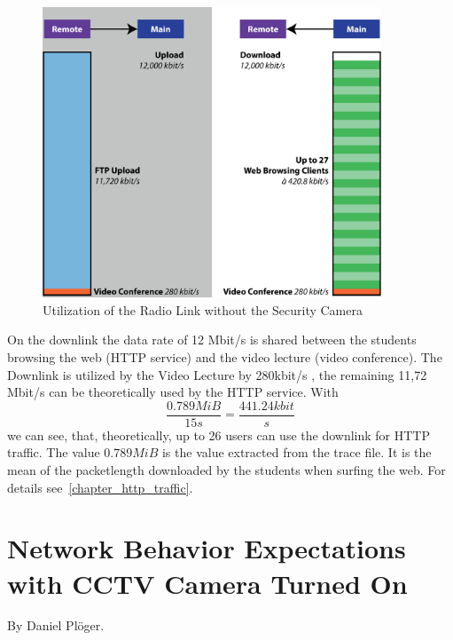 \documentclass[a4paper,10pt]{book}\usepackage{graphicx}
\begin{document}
\begin{figure}[!ht]
  \begin{center}
    \includegraphics[width=0.9\textwidth]{graphics-02.eps}
    \caption{Utilization of the Radio Link without the Security Camera}
    \label{fig:rLink}
    \end{center}
\end{figure}

On the downlink the data rate of 12 Mbit/s is shared between the students browsing the web (HTTP service) and the video lecture (video conference).
The Downlink is utilized by the Video Lecture by 280kbit/s , the remaining 11,72 Mbit/s can be theoretically used by the HTTP service. With 
\begin{equation}
 \frac{0.789 MiB}{15s}=\frac{441.24 kbit}{s}
\end{equation}
we can see, that, theoretically, up to 26 users can use the downlink for HTTP traffic. The value $0.789MiB$ is the value extracted from the trace file. It is the mean of the packetlength downloaded by the students when surfing the web. For details see~\ref{chapter_http_traffic}.

\section{Network Behavior Expectations with CCTV Camera Turned On}
\label{chapter_expectations}
By Daniel Plöger.\\
\end{document}
